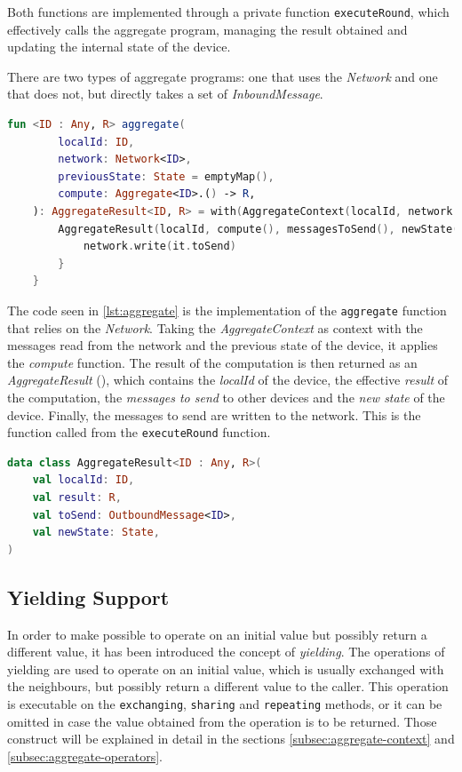 Both functions are implemented through a private function \texttt{executeRound}, which effectively calls the aggregate program,
managing the result obtained and updating the internal state of the device.

There are two types of aggregate programs: one that uses the \emph{Network} and one that does not, but directly takes
a set of \emph{InboundMessage}.

\begin{lstlisting}[language=kt,label={lst:aggregate}, caption={The signature of the \texttt{aggregate program}.}]
fun <ID : Any, R> aggregate(
        localId: ID,
        network: Network<ID>,
        previousState: State = emptyMap(),
        compute: Aggregate<ID>.() -> R,
    ): AggregateResult<ID, R> = with(AggregateContext(localId, network.read(), previousState)) {
        AggregateResult(localId, compute(), messagesToSend(), newState()).also {
            network.write(it.toSend)
        }
    }
\end{lstlisting}

The code seen in \ref{lst:aggregate} is the implementation of the \texttt{aggregate} function that relies on the \emph{Network}.
Taking the \emph{AggregateContext} as context with the messages read from the network and the previous state of the
device, it applies the \emph{compute} function.
The result of the computation is then returned as an \emph{AggregateResult} (), which contains the \emph{localId} of the device,
the effective \emph{result} of the computation, the \emph{messages to send} to other devices and the \emph{new state} of the device.
Finally, the messages to send are written to the network.
This is the function called from the \texttt{executeRound} function.

\begin{lstlisting}[language=kt,label={lst:aggregateresult}, caption={The signature of the \texttt{aggregate result}.}]
data class AggregateResult<ID : Any, R>(
    val localId: ID,
    val result: R,
    val toSend: OutboundMessage<ID>,
    val newState: State,
)
\end{lstlisting}

\subsection{Yielding Support}
\label{subsec:yielding-support}
In order to make possible to operate on an initial value but possibly return a different value, it has been introduced
the concept of \emph{yielding}.
The operations of yielding are used to operate on an initial value, which is usually exchanged with the neighbours,
but possibly return a different value to the caller.
This operation is executable on the \texttt{exchanging}, \texttt{sharing} and \texttt{repeating} methods, or it can be omitted
in case the value obtained from the operation is to be returned. Those construct will be explained in detail in the
sections \ref{subsec:aggregate-context} and \ref{subsec:aggregate-operators}.

